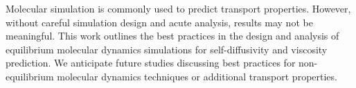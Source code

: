 \documentclass[9pt,bestpractices]{livecoms}
\begin{document}
%

Molecular simulation is commonly used to predict transport properties. However, without careful simulation design and acute analysis, results may not be meaningful. This work outlines the best practices in the design and analysis of equilibrium molecular dynamics simulations for self-diffusivity and viscosity prediction. We anticipate future studies discussing best practices for non-equilibrium molecular dynamics techniques or additional transport properties.
\end{document}
